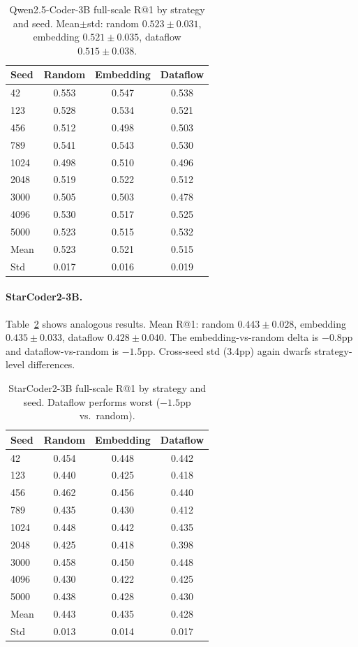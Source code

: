 \documentclass[11pt,a4paper]{article}
\begin{document}
\begin{table}[t]
\centering
\small
\caption{Qwen2.5-Coder-3B full-scale R@1 by strategy and seed. Mean$\pm$std: random $0.523 \pm 0.031$, embedding $0.521 \pm 0.035$, dataflow $0.515 \pm 0.038$.}
\label{tab:qwen_full}
\begin{tabular}{lccc}
\toprule
Seed & Random & Embedding & Dataflow \\
\midrule
42   & 0.553 & 0.547 & 0.538 \\
123  & 0.528 & 0.534 & 0.521 \\
456  & 0.512 & 0.498 & 0.503 \\
789  & 0.541 & 0.543 & 0.530 \\
1024 & 0.498 & 0.510 & 0.496 \\
2048 & 0.519 & 0.522 & 0.512 \\
3000 & 0.505 & 0.503 & 0.478 \\
4096 & 0.530 & 0.517 & 0.525 \\
5000 & 0.523 & 0.515 & 0.532 \\
\midrule
Mean & 0.523 & 0.521 & 0.515 \\
Std  & 0.017 & 0.016 & 0.019 \\
\bottomrule
\end{tabular}
\end{table}

\paragraph{StarCoder2-3B.}
Table~\ref{tab:starcoder_full} shows analogous results.
Mean R@1: random $0.443 \pm 0.028$, embedding $0.435 \pm 0.033$, dataflow $0.428 \pm 0.040$.
The embedding-vs-random delta is $-0.8$pp and dataflow-vs-random is $-1.5$pp.
Cross-seed std (3.4pp) again dwarfs strategy-level differences.

\begin{table}[t]
\centering
\small
\caption{StarCoder2-3B full-scale R@1 by strategy and seed. Dataflow performs worst ($-1.5$pp vs.\ random).}
\label{tab:starcoder_full}
\begin{tabular}{lccc}
\toprule
Seed & Random & Embedding & Dataflow \\
\midrule
42   & 0.454 & 0.448 & 0.442 \\
123  & 0.440 & 0.425 & 0.418 \\
456  & 0.462 & 0.456 & 0.440 \\
789  & 0.435 & 0.430 & 0.412 \\
1024 & 0.448 & 0.442 & 0.435 \\
2048 & 0.425 & 0.418 & 0.398 \\
3000 & 0.458 & 0.450 & 0.448 \\
4096 & 0.430 & 0.422 & 0.425 \\
5000 & 0.438 & 0.428 & 0.430 \\
\midrule
Mean & 0.443 & 0.435 & 0.428 \\
Std  & 0.013 & 0.014 & 0.017 \\
\bottomrule
\end{tabular}
\end{table}
\end{document}
